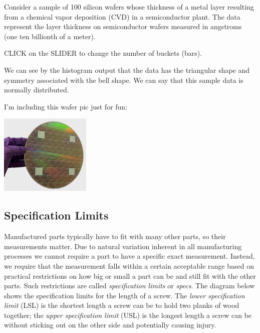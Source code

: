 \documentclass{ximera}
\begin{document}
\begin{exploration}\label{exp:histogram1}
Consider a sample of 100 silicon wafers whose thickness of a metal layer resulting from a chemical vapor deposition (CVD) in a semiconductor plant. The data represent the layer thickness on semiconductor wafers measured in angstroms (one ten billionth of a meter).


CLICK on the SLIDER to change the number of buckets (bars).

\begin{onlineOnly}
\begin{center} 
\end{center}
\end{onlineOnly}

We can see by the histogram output that the data has the triangular shape and symmetry associated with the bell shape. We can say that this sample data is normally distributed.

I'm including this wafer pic just for fun:

\begin{image}
         \includegraphics[height=1.5in]{200mmWafer.png}
\end{image}
\end{exploration}

\subsection*{Specification Limits}
Manufactured parts typically have to fit with many other parts, so their measurements matter. Due to natural variation inherent in all manufacturing processes we cannot require a part to have a specific exact measurement.  Instead, we require that the measurement falls within a certain acceptable range based on practical restrictions on how big or small a part can be and still fit with the other parts.  Such restrictions are called \emph{specification limits} or \emph{specs}.  The diagram below shows the specification limits for the length of a screw.  The \emph{lower specification limit} (LSL) is the shortest length a screw can be to hold two planks of wood together; the \emph{upper specification limit} (USL) is the longest length a screw can be without sticking out on the other side and potentially causing injury.
\end{document}

